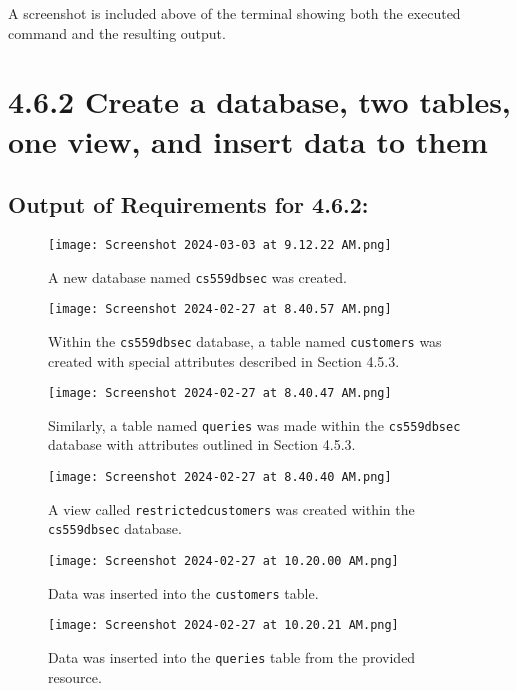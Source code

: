 \documentclass{article}
\begin{document}
A screenshot is included above of the terminal showing both the executed command and the resulting output. 

\section*{4.6.2 Create a database, two tables, one view, and insert data to them}

\subsection*{Output of Requirements for 4.6.2:}

\begin{figure}[H]
    \centering
    \texttt{[image: Screenshot 2024-03-03 at 9.12.22 AM.png]}
    \caption{A new database named  \texttt{cs559dbsec} was created.}
\end{figure}

\begin{figure}[H]
    \centering
    \texttt{[image: Screenshot 2024-02-27 at 8.40.57 AM.png]}
    \caption{Within the \texttt{cs559dbsec} database, a table named \texttt{customers} was created with special attributes described in Section 4.5.3.}
\end{figure}

\begin{figure}[H]
    \centering
    \texttt{[image: Screenshot 2024-02-27 at 8.40.47 AM.png]}
    \caption{Similarly, a table named \texttt{queries} was made within the \texttt{cs559dbsec} database with attributes outlined in Section 4.5.3.}
\end{figure}

\begin{figure}[H]
    \centering
    \texttt{[image: Screenshot 2024-02-27 at 8.40.40 AM.png]}
    \caption{A view called \texttt{restrictedcustomers} was created within the \texttt{cs559dbsec} database.}
\end{figure}

\begin{figure}[H]
    \centering
    \texttt{[image: Screenshot 2024-02-27 at 10.20.00 AM.png]}
    \caption{Data was inserted into the \texttt{customers} table.}
\end{figure}

\begin{figure}[H]
    \centering
    \texttt{[image: Screenshot 2024-02-27 at 10.20.21 AM.png]}
    \caption{Data was inserted into the \texttt{queries} table from the provided resource.}
\end{figure}
\end{document}
